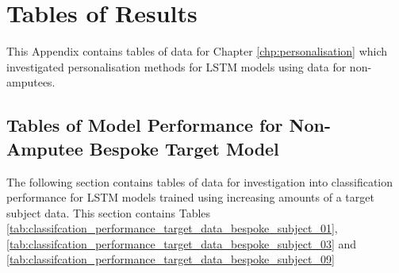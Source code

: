 \chapter{Tables of Results}
This Appendix contains tables of data for Chapter \ref{chp:personalisation} which investigated personalisation methods for LSTM models using data for non-amputees.

\section{Tables of Model Performance for Non-Amputee Bespoke Target Model}
\label{sec:appendix-a-model-performance-bespoke}
The following section contains tables of data for investigation into classification performance for LSTM models trained using increasing amounts of a target subject data. This section contains Tables \ref{tab:classifcation_performance_target_data_bespoke_subject_01}, \ref{tab:classifcation_performance_target_data_bespoke_subject_03} and \ref{tab:classifcation_performance_target_data_bespoke_subject_09}
\vfill
\  \\
